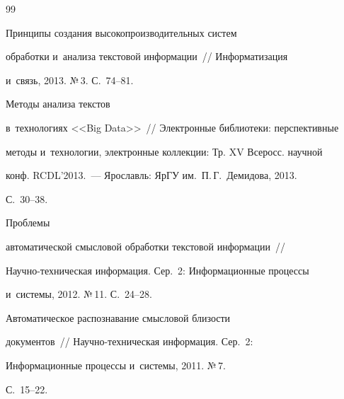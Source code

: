 

     


{\small\frenchspacing


{%




\begin{thebibliography}{99}







 Принципы создания высокопроизводительных систем 


обработки и~анализа текстовой информации~/\!\!/ Информатизация 


и~связь, 2013. №\,3. С.~74--81.




 Методы анализа текстов 


в~технологиях <<Big Data>>~/\!\!/ Электронные библиотеки: перспективные 


методы и~технологии, электронные коллекции: Тр. XV Всеросс. научной 


конф. RCDL'2013.~--- Ярославль: ЯрГУ им.\ П.\,Г.~Демидова, 2013.  


С.~30--38.







 Проблемы 


автоматической смысловой обработки текстовой информации~/\!\!/  


Научно-техническая информация. Сер.~2: Информационные процессы 


и~системы, 2012. №\,11. С.~24--28. 







 Автоматическое распознавание смысловой близости 


документов~/\!\!/ Научно-техническая информация. Сер.~2: 


Информационные процессы и~системы, 2011. №\,7.  


С.~15--22. 












\end{thebibliography}}}
